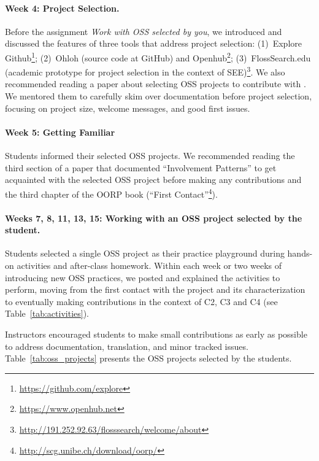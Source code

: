\documentclass[sigconf]{acmart}
\begin{document}
\paragraph{\textbf{Week 4: Project Selection.}}
Before the assignment \textit{Work with OSS selected by you},
we introduced and discussed the features of three tools that address project selection:
(1)~Explore Github\footnote{\url{https://github.com/explore}};
(2)~Ohloh (source code at GitHub) and  Openhub\footnote{\url{https://www.openhub.net}};
(3)~FlossSearch.edu (academic prototype for project selection in the context of SEE)\footnote{\url{http://191.252.92.63/flosssearch/welcome/about}}.
We also recommended reading a paper about selecting OSS projects to contribute with
\cite{10.1145/2591028.2600812}.
We mentored them to carefully skim over documentation before project selection, focusing on project size, welcome messages, and good first issues.

\paragraph{\textbf{Week 5: Getting Familiar}}

Students informed their selected OSS projects.
We recommended reading the third section of a paper that documented ``Involvement Patterns'' to get acquainted with the selected OSS project before making any contributions
\cite{10.1145/2591028.2600812} 
and the third chapter of the OORP book (``First Contact''\footnote{\url{http://scg.unibe.ch/download/oorp/}}).

\paragraph{\textbf{Weeks 7, 8, 11, 13, 15: Working with an OSS project selected by the student.}}
Students selected a single OSS project as their practice playground during hands-on activities and after-class homework. 
Within each week or two weeks of introducing new OSS practices, 
we posted and explained the activities to perform, 
moving from the first contact with the project and its characterization 
to eventually making contributions in the context of C2, C3 and C4 (see Table~\ref{tab:activities}).

Instructors encouraged students to make small contributions as early as possible to address documentation, translation, and minor tracked issues.
Table~\ref{tab:oss_projects} presents the  OSS projects selected by the students.
\end{document}
